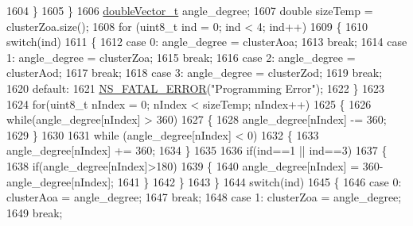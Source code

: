 \begin{DoxyCode}
1604                 \}
1605         \}
1606         \hyperlink{namespacens3_aa6f1edf6566ca6afec613bc6e40240ea}{doubleVector\_t} angle\_degree;
1607         \textcolor{keywordtype}{double} sizeTemp = clusterZoa.size();
1608         \textcolor{keywordflow}{for} (uint8\_t ind = 0; ind < 4; ind++)
1609         \{
1610                 \textcolor{keywordflow}{switch}(ind)
1611                 \{
1612                 \textcolor{keywordflow}{case} 0: angle\_degree = clusterAoa;
1613                                 \textcolor{keywordflow}{break};
1614                 \textcolor{keywordflow}{case} 1: angle\_degree = clusterZoa;
1615                                 \textcolor{keywordflow}{break};
1616                 \textcolor{keywordflow}{case} 2: angle\_degree = clusterAod;
1617                                 \textcolor{keywordflow}{break};
1618                 \textcolor{keywordflow}{case} 3: angle\_degree = clusterZod;
1619                                 \textcolor{keywordflow}{break};
1620                 \textcolor{keywordflow}{default}:
1621                         \hyperlink{group__fatal_ga5131d5e3f75d7d4cbfd706ac456fdc85}{NS\_FATAL\_ERROR}(\textcolor{stringliteral}{"Programming Error"});
1622                 \}
1623 
1624                 \textcolor{keywordflow}{for}(uint8\_t nIndex = 0; nIndex < sizeTemp; nIndex++)
1625                 \{
1626                         \textcolor{keywordflow}{while}(angle\_degree[nIndex] > 360)
1627                         \{
1628                                 angle\_degree[nIndex] -= 360;
1629                         \}
1630 
1631                         \textcolor{keywordflow}{while} (angle\_degree[nIndex] < 0)
1632                         \{
1633                                 angle\_degree[nIndex] += 360;
1634                         \}
1635 
1636                         \textcolor{keywordflow}{if}(ind==1 || ind==3)
1637                         \{
1638                                 \textcolor{keywordflow}{if}(angle\_degree[nIndex]>180)
1639                                 \{
1640                                         angle\_degree[nIndex] = 360-angle\_degree[nIndex];
1641                                 \}
1642                         \}
1643                 \}
1644                 \textcolor{keywordflow}{switch}(ind)
1645                 \{
1646                 \textcolor{keywordflow}{case} 0: clusterAoa = angle\_degree;
1647                                 \textcolor{keywordflow}{break};
1648                 \textcolor{keywordflow}{case} 1: clusterZoa = angle\_degree;
1649                                 \textcolor{keywordflow}{break};

\end{DoxyCode}
